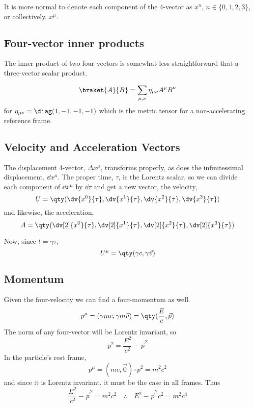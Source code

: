 It is more normal to denote each component of the 4-vector as $x^n$,
$n \in \{0,1,2,3 \}$, or collectively, $x^{\mu}$.

\subsection{Four-vector inner products}
\label{sec:four-vector-inner}

The inner product of two four-vectors is somewhat less straightforward
that a three-vector scalar product.

\begin{definition}
  \begin{equation}
    \label{eq:3}
    \braket{A}{B} = \sum_{\mu, \nu} \eta_{\mu \nu} A^{\mu} B^{\nu}
  \end{equation}
  for $\eta_{\mu \nu} = \diag(1, -1, -1, -1)$ which is the metric
  tensor for a non-accelerating reference frame.
\end{definition}

\subsection{Velocity and Acceleration Vectors}
\label{sec:veloc-accel-vect}

The displacement 4-vector, $\Delta x^{\mu}$, transforms properly, as
does the infinitessimal displacement, $\dd{x^{\mu}}$. The proper time,
$\tau$, is the Lorentz scalar, so we can divide each component of
$\dd{x^{\mu}}$ by $\dd{\tau}$ and get a new vector, the velocity,
\[ U = \qty( \dv{x^0}{\tau}, \dv{x^1}{\tau}, \dv{x^2}{\tau}, \dv{x^3}{\tau} ) \]
and likewise, the acceleration,
\[ A = \qty( \dv[2]{x^0}{\tau}, \dv[2]{x^1}{\tau}, \dv[2]{x^2}{\tau}, \dv[2]{x^3}{\tau} ) \]

Now, since $t = \gamma \tau$,
\[ U^{\mu} = \qty( \gamma c , \gamma \vec{v} ) \]


\subsection{Momentum}
\label{sec:momentum}

Given the four-velocity we can find a four-momentum as well.
\[ p^{\mu} = (\gamma m c, \gamma m \vec{v} ) = \qty(\frac{E}{c}, \vec{p} )\]
The norm of any four-vector will be Lorentz invariant, so 
\[ p^2 = \frac{E^2}{c^2} - \vec{p}^2 \]
In the particle's rest frame,
\[ p^{\mu} = (mc, \vec{0}) \therefore p^2 = m^2 c^2 \]
and since it is Lorentz invariant, it must be the case in all frames.
Thus
\[ \frac{E^2}{c^2} - \vec{p}^2 = m^2 c^2  \quad \therefore \quad E^2 - \vec{p}^2 c^2 = m^2 c^4 \]

